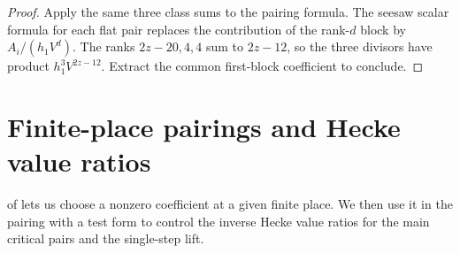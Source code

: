\begin{proof}
Apply the same three class sums to the pairing formula. The seesaw scalar formula for each flat pair replaces the contribution of the rank-$d$ block by $A_i/(h_1V^d)$. The ranks $2z-20,4,4$ sum to $2z-12$, so the three divisors have product $h_1^3V^{2z-12}$. Extract the common first-block coefficient to conclude.
\end{proof}

\section{Finite-place pairings and Hecke value ratios}
\label{sec:c-hecke-ratios}

 of  lets us choose a nonzero coefficient at a given finite place. We then use it in the pairing with a test form to control the inverse Hecke value ratios for the main critical pairs and the single-step lift.

